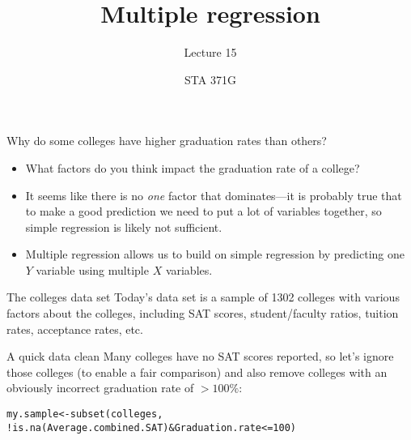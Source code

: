 \documentclass{beamer}\usepackage[]{graphicx}\usepackage[]{color}
\title{Multiple regression}
\subtitle{Lecture 15}
\author{STA 371G}
\makeatletter
\newcommand{\hlnum}[1]{\textcolor[rgb]{0.824,0.412,0.118}{#1}}%
\newcommand{\hlopt}[1]{\textcolor[rgb]{1,0.894,0.769}{#1}}%
\newcommand{\hlstd}[1]{\textcolor[rgb]{1,0.894,0.769}{#1}}%
\newcommand{\hlkwb}[1]{\textcolor[rgb]{0.804,0.776,0.451}{#1}}%
\newcommand{\hlkwd}[1]{\textcolor[rgb]{1,0.78,0.769}{#1}}%
\newenvironment{kframe}{%
 \def\at@end@of@kframe{}%
 \ifinner\ifhmode%
  \def\at@end@of@kframe{\end{minipage}}%
  \begin{minipage}{\columnwidth}%
 \fi\fi%
 \def\FrameCommand##1{\hskip\@totalleftmargin \hskip-\fboxsep
 \colorbox{shadecolor}{##1}\hskip-\fboxsep
     \hskip-\linewidth \hskip-\@totalleftmargin \hskip\columnwidth}%
 \MakeFramed {\advance\hsize-\width
   \@totalleftmargin\z@ \linewidth\hsize
   \@setminipage}}%
 {\par\unskip\endMakeFramed%
 \at@end@of@kframe}
\newenvironment{knitrout}{}{} %
\makeatother
\begin{document}
  
  

  \frame{\maketitle}



  \begin{darkframes}
    \begin{frame}{Why do some colleges have higher graduation rates than others?}
      \begin{itemize}[<+->]
        \item What factors do you think impact the graduation rate of a college?
        \item It seems like there is no \emph{one} factor that dominates---it is probably true that to make a good prediction we need to put a lot of variables together, so simple regression is likely not sufficient.
        \item \alert{Multiple regression} allows us to build on simple regression by predicting one $Y$ variable using multiple $X$ variables.
      \end{itemize}
    \end{frame}

    \begin{frame}{The colleges data set}
      Today's data set is a sample of 1302 colleges with various factors about the colleges, including SAT scores, student/faculty ratios, tuition rates, acceptance rates, etc.
    \end{frame}

    \begin{frame}[fragile]{A quick data clean}
      Many colleges have no SAT scores reported, so let's ignore those colleges (to enable a fair comparison) and also remove colleges with an obviously incorrect graduation rate of $>100\%$:
\begin{knitrout}
\color{fgcolor}\begin{kframe}
\begin{alltt}
\hlstd{my.sample} \hlkwb{<-} \hlkwd{subset}\hlstd{(colleges,}
  \hlopt{!}\hlkwd{is.na}\hlstd{(Average.combined.SAT)} \hlopt{&} \hlstd{Graduation.rate} \hlopt{<=} \hlnum{100}\hlstd{)}
\end{alltt}
\end{kframe}
\end{knitrout}
    \end{frame}


\end{darkframes}
\end{document}

